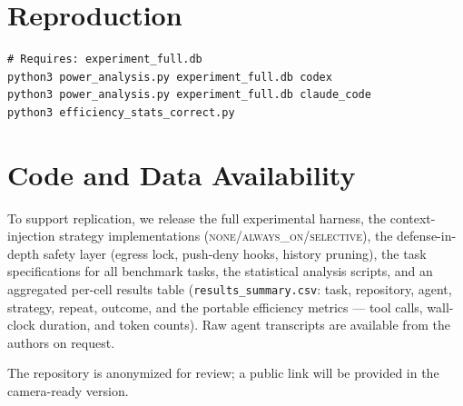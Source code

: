 \documentclass[11pt]{article}
\newcommand{\none}{\textsc{none}}
\newcommand{\alwayson}{\textsc{always\_on}}
\newcommand{\selective}{\textsc{selective}}
\begin{document}
\section{Reproduction}
\label{app:reproduce}

\begin{verbatim}
# Requires: experiment_full.db
python3 power_analysis.py experiment_full.db codex
python3 power_analysis.py experiment_full.db claude_code
python3 efficiency_stats_correct.py
\end{verbatim}

\section{Code and Data Availability}
\label{app:availability}

To support replication, we release the full experimental harness, the
context-injection strategy implementations (\none{}/\alwayson{}/\selective{}),
the defense-in-depth safety layer (egress lock, push-deny hooks, history
pruning), the task specifications for all benchmark tasks, the statistical
analysis scripts, and an aggregated per-cell results table
(\texttt{results\_summary.csv}: task, repository, agent, strategy, repeat,
outcome, and the portable efficiency metrics --- tool calls, wall-clock
duration, and token counts). Raw agent transcripts are available from the
authors on request.

The repository is anonymized for review; a public link will be provided in the
camera-ready version.
\end{document}
